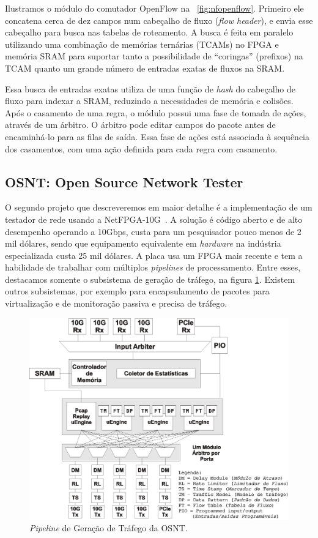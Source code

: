 Ilustramos o módulo  do comutador OpenFlow
na \figstr~\ref{fig:nfopenflow}.  Primeiro ele concatena cerca de
dez campos num cabeçalho de fluxo (\emph{flow header}), e envia esse
cabeçalho para busca nas tabelas de roteamento. A busca é feita em
paralelo utilizando uma combinação de memórias ternárias (TCAMs) no
FPGA e memória SRAM para suportar tanto a possibilidade de
``coringas'' (prefixos) na TCAM quanto um grande número de entradas
exatas de fluxos na SRAM.

Essa busca de entradas exatas utiliza de uma função de \emph{hash}
do cabeçalho de fluxo para indexar a SRAM, reduzindo a necessidades
de memória e colisões. Após o casamento de uma regra, o módulo
possui uma fase de tomada de ações, através de um árbitro.  O
árbitro pode editar campos do pacote antes de encaminhá-lo para as
filas de saída. Essa fase de ações está associada à sequência dos
casamentos, com uma ação definida para cada regra com casamento.

\subsection{OSNT: Open Source Network Tester}

O segundo projeto que descreveremos em maior detalhe é a
implementação de um testador de rede usando a
NetFPGA-10G~\cite{shahbaz2013arch}. A solução é código aberto e de
alto desempenho operando a 10Gbps, custa para um pesquisador pouco
menos de 2 mil dólares, sendo que equipamento equivalente em
\textit{hardware} na indústria especializada custa 25 mil dólares. A
placa usa um FPGA mais recente e tem a habilidade de trabalhar com
múltiplos \textit{pipelines} de processamento. Entre esses,
destacamos somente o subsistema de geração de tráfego, na figura
\ref{fig:osnt1}. Existem outros subsistemas, por exemplo para
encapsulamento de pacotes para virtualização e de monitoração
passiva e precisa de tráfego.

\begin{figure}[h]
\centering
\includegraphics[scale=0.5]{figures/netfpga-rev/osnt1.eps}
\caption{\emph{Pipeline} de Geração de Tráfego da OSNT.}
\label{fig:osnt1}
\end{figure}

